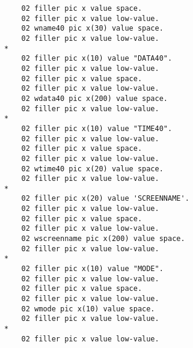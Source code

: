 {{{\begin{verbatim}
          02 filler pic x value space.
          02 filler pic x value low-value.
          02 wname40 pic x(30) value space.
          02 filler pic x value low-value.
      *    
          02 filler pic x(10) value "DATA40".
          02 filler pic x value low-value.
          02 filler pic x value space.
          02 filler pic x value low-value.
          02 wdata40 pic x(200) value space.
          02 filler pic x value low-value.
      *    
          02 filler pic x(10) value "TIME40".
          02 filler pic x value low-value.
          02 filler pic x value space.
          02 filler pic x value low-value.
          02 wtime40 pic x(20) value space.
          02 filler pic x value low-value.
      *
          02 filler pic x(20) value 'SCREENNAME'.
          02 filler pic x value low-value.
          02 filler pic x value space.
          02 filler pic x value low-value.
          02 wscreenname pic x(200) value space.
          02 filler pic x value low-value.
      *
          02 filler pic x(10) value "MODE".
          02 filler pic x value low-value.
          02 filler pic x value space.
          02 filler pic x value low-value.
          02 wmode pic x(10) value space.
          02 filler pic x value low-value.
      *
          02 filler pic x value low-value.


\end{verbatim}}}}
